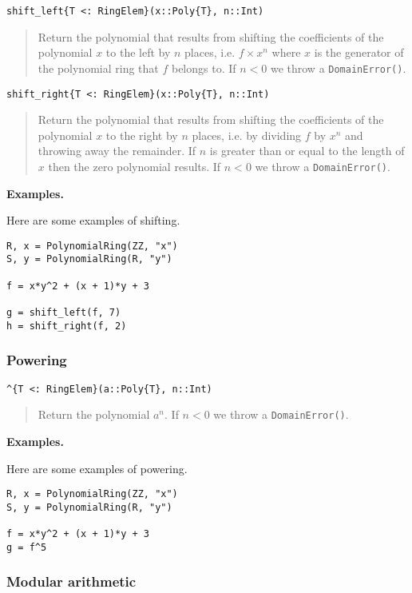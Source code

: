 \documentclass[a4paper,10pt]{article}
\newcommand{\code}{\lstinline}
\newcommand{\desc}[1]{\vspace{-3mm}\begin{quote}#1\end{quote}}
\begin{document}
\begin{lstlisting}
shift_left{T <: RingElem}(x::Poly{T}, n::Int)
\end{lstlisting}

\desc{Return the polynomial that results from shifting the coefficients of the
polynomial $x$ to the left by $n$ places, i.e. $f\times x^n$ where $x$ is the
generator of the polynomial ring that $f$ belongs to. If $n < 0$ we throw a
\code{DomainError()}.}

\begin{lstlisting}
shift_right{T <: RingElem}(x::Poly{T}, n::Int)
\end{lstlisting}

\desc{Return the polynomial that results from shifting the coefficients of the
polynomial $x$ to the right by $n$ places, i.e. by dividing $f$ by $x^n$ and
throwing away the remainder. If $n$ is greater than or equal to the length of
$x$ then the zero polynomial results. If $n < 0$ we throw a 
\code{DomainError()}.}

\textbf{Examples.}

Here are some examples of shifting.

\begin{lstlisting}
R, x = PolynomialRing(ZZ, "x")
S, y = PolynomialRing(R, "y")

f = x*y^2 + (x + 1)*y + 3

g = shift_left(f, 7)
h = shift_right(f, 2)
\end{lstlisting}

\subsubsection{Powering}

\begin{lstlisting}
^{T <: RingElem}(a::Poly{T}, n::Int)
\end{lstlisting}

\desc{Return the polynomial $a^n$. If $n < 0$ we throw a \code{DomainError()}.}

\textbf{Examples.}

Here are some examples of powering.

\begin{lstlisting}
R, x = PolynomialRing(ZZ, "x")
S, y = PolynomialRing(R, "y")

f = x*y^2 + (x + 1)*y + 3
g = f^5
\end{lstlisting}

\subsubsection{Modular arithmetic}
\end{document}
